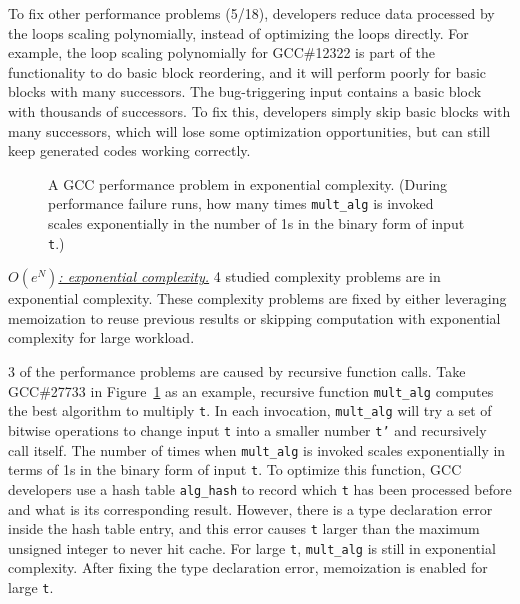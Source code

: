 To fix other performance problems (5/18), 
developers reduce data processed by the loops scaling polynomially, 
instead of optimizing the loops directly. 
For example, the loop scaling polynomially for GCC\#12322 is part 
of the functionality to do basic block reordering, 
and it will perform poorly for basic blocks with many successors. 
The bug-triggering input contains a basic block with thousands of successors. 
To fix this, developers simply skip basic blocks with many successors, 
which will lose some optimization opportunities, 
but can still keep generated codes working correctly. 


\begin{figure}
\centering
{}
  \mbox{}
\caption{A GCC performance problem in exponential complexity. 
 \footnotesize{(During performance failure runs, how many times \texttt{mult\_alg} is invoked scales exponentially
  in the number of 1s in the binary form of input \texttt{t}.)}}
\vspace{-0.05in}
\label{fig:gcc27733}
\vspace{-0.05in}
\end{figure}


{\underline{\textit{$O(e^N)$: exponential complexity.}}}
4 studied complexity problems are in exponential complexity. 
These complexity problems are fixed by 
either leveraging memoization to reuse previous results 
or skipping computation with exponential complexity for large workload. 

3 of the performance problems are caused by recursive function calls. 
Take GCC\#27733 in Figure~\ref{fig:gcc27733} as an example, 
recursive function \texttt{mult\_alg} computes the best algorithm to multiply \texttt{t}.
In each invocation, \texttt{mult\_alg} will try a set of bitwise 
operations to change input 
\texttt{t} into a smaller number \texttt{t'} and recursively call itself. 
The number of times when \texttt{mult\_alg} is invoked scales exponentially 
in terms of 1s in the binary form of input \texttt{t}. 
To optimize this function, 
GCC developers use a hash table \texttt{alg\_hash} to record
which \texttt{t} has been processed before and what is its corresponding result.
However, there is a type declaration error inside the hash table entry,
and this error causes \texttt{t} larger than the maximum unsigned integer to never hit cache.
For large \texttt{t}, \texttt{mult\_alg} is still in exponential complexity. 
After fixing the type declaration error, 
memoization is enabled for large \texttt{t}. 

